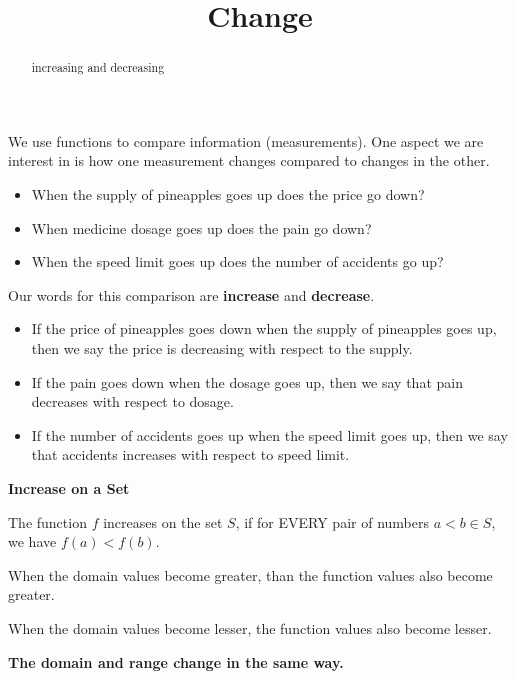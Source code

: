 \documentclass{ximera}
\title{Change}
\begin{document}
\begin{abstract}
increasing and decreasing
\end{abstract}
\maketitle



We use functions to compare information (measurements). One aspect we are interest in is how one measurement changes compared to changes in the other. 


\begin{itemize}
\item When the supply of pineapples goes up does the price go down?
\item When medicine dosage goes up does the pain go down?
\item When the speed limit goes up does the number of accidents go up?
\end{itemize}


Our words for this comparison are \textbf{\textcolor{purple!85!blue}{increase}} and \textbf{\textcolor{purple!85!blue}{decrease}}.


\begin{itemize}
\item If the price of pineapples goes down when the supply of pineapples goes up, then we say the price is decreasing with respect to the supply. 
\item If the pain goes down when the dosage goes up, then we say that pain decreases with respect to dosage. 
\item If the number of accidents goes up when the speed limit goes up, then we say that accidents increases with respect to speed limit.
\end{itemize}




\begin{definition} \textbf{\textcolor{green!50!black}{Increase on a Set}} 

The function $f$ increases on the set $S$, if for EVERY pair of numbers $a < b \in S$, we have  $f(a) < f(b)$. 

When the domain values become greater, than the function values also become greater.  

When the domain values become lesser, the function values also become lesser.  


\textbf{\textcolor{purple!85!blue}{The domain and range change in the same way.}}



\end{definition}
\end{document}
